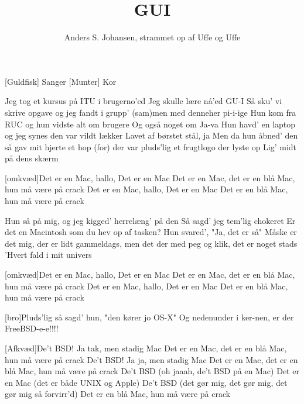 \documentclass[a4paper,11pt]{article}
\title{GUI}
\author{Anders S. Johansen, strammet op af Uffe og Uffe}
\begin{document}
\maketitle

\begin{roles}
[Guldfisk] Sanger 
[Munter] Kor
\end{roles}

\begin{props}
\end{props}

  
\begin{song}

Jeg tog et kursus på ITU i brugerno'ed
Jeg skulle lære nå'ed GU-I
Så sku' vi skrive opgave og jeg fandt i grupp'
(sam)men med denneher pi-i-ige
Hun kom fra RUC og hun vidste alt om brugere
Og også noget om Ja-va
Hun havd' en laptop og jeg synes den var vildt lækker
Lavet af børstet stål, ja
Men da hun åbned' den så gav mit hjerte et hop
(for) der var pluds'lig et frugtlogo der lyste op
Lig' midt på dens skærm


[omkvæd]Det er en Mac, hallo, Det er en Mac
Det er en Mac, det er en blå Mac, hun må være på crack
Det er en Mac, hallo, Det er en Mac
Det er en blå Mac, hun må være på crack


Hun så på mig, og jeg kigged' herrelæng' på den
Så sagd' jeg tem'lig chokeret
Er det en Macintosh som du hev op af tasken?
Hun svared', "Ja, det er så"
Måske er det mig, der er lidt gammeldags, men det der med peg og klik, 
det er noget stads
'Hvert fald i mit univers


[omkvæd]Det er en Mac, hallo, Det er en Mac
Det er en Mac, det er en blå Mac, hun må være på crack
Det er en Mac, hallo, Det er en Mac
Det er en blå Mac, hun må være på crack


[bro]Pluds'lig så sagd' hun, "den kører jo OS-X"
Og nedenunder i ker-nen, er der FreeBSD-e-e!!!!


[Afkvæd]De't BSD! Ja tak, men stadig Mac
Det er en Mac, det er en blå Mac, hun må være på crack
De't BSD! Ja ja, men stadig Mac
Det er en Mac, det er en blå Mac, hun må være på crack
De't BSD (oh jaaah, de't BSD på en Mac)
Det er en Mac (det er både UNIX og Apple)
De't BSD (det gør mig, det gør mig, det gør mig så forvirr'd)
Det er en blå Mac, hun må være på crack



\end{song}
\end{document}
